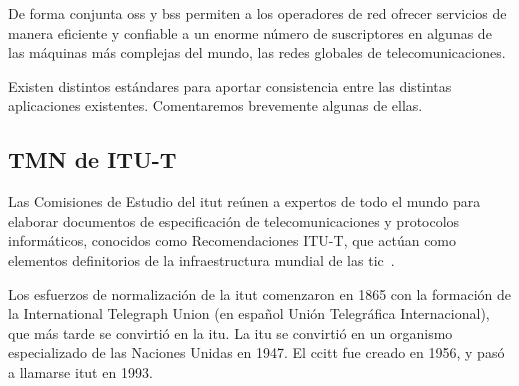 De forma conjunta \acrshort{oss} y \acrshort{bss} permiten a los operadores de red ofrecer servicios de manera eficiente y confiable a un enorme número de suscriptores en algunas de las máquinas más complejas del mundo, las redes globales de telecomunicaciones.

Existen distintos estándares para aportar consistencia entre las distintas aplicaciones existentes. Comentaremos brevemente algunas de ellas.

\subsection{TMN de ITU-T}

Las Comisiones de Estudio del \acrfull{itut} reúnen a expertos de todo el mundo para elaborar documentos de especificación de telecomunicaciones y protocolos informáticos, conocidos como Recomendaciones ITU-T, que actúan como elementos definitorios de la infraestructura mundial de las \acrfull{tic}~\cite{ITU-T}. 

Los esfuerzos de normalización de la \acrshort{itut} comenzaron en 1865 con la formación de la International Telegraph Union (en español Unión Telegráfica Internacional), que más tarde se convirtió en la \acrfull{itu}. La \acrshort{itu} se convirtió en un organismo especializado de las Naciones Unidas en 1947. El \acrfull{ccitt} fue creado en 1956, y pasó a llamarse \acrshort{itut} en 1993.


